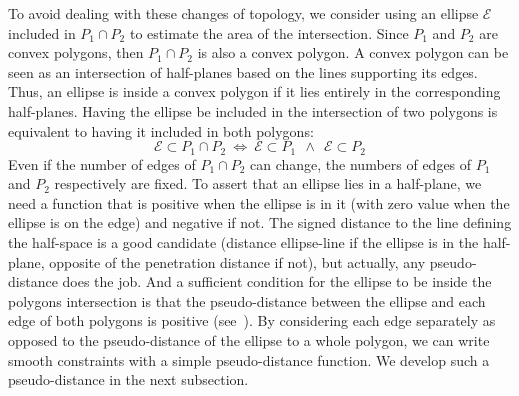 To avoid dealing with these changes of topology, we consider using an ellipse $\mathcal{E}$ included in $P_1 \cap P_2$ to estimate the area of the intersection.
Since $P_1$ and $P_2$ are convex polygons, then $P_1 \cap P_2$ is also a convex polygon.
A convex polygon can be seen as an intersection of half-planes based on the lines supporting its edges.
Thus, an ellipse is inside a convex polygon if it lies entirely in the corresponding half-planes.
Having the ellipse be included in the intersection of two polygons is equivalent to having it included in both polygons:
\begin{equation}
\mathcal{E} \subset P_1 \cap P_2 \ \Longleftrightarrow \
\mathcal{E} \subset P_1 \ \ \wedge \ \  \mathcal{E} \subset P_2
\end{equation}
Even if the number of edges of $P_1 \cap P_2$ can change, the numbers of edges of $P_1$ and $P_2$ respectively are fixed.
To assert that an ellipse lies in a half-plane, we need a function that is positive when the ellipse is in it (with zero value when the ellipse is on the edge) and negative if not.
The signed distance to the line defining the half-space is a good candidate (distance ellipse-line if the ellipse is in the half-plane, opposite of the penetration distance if not), but actually, any pseudo-distance does the job.
And a sufficient condition for the ellipse to be inside the polygons intersection is that the pseudo-distance between the ellipse and each edge of both polygons is positive (see~\Figref{fig:distance}{}).
By considering each edge separately as opposed to the pseudo-distance of the ellipse to a whole polygon, we can write smooth constraints with a simple pseudo-distance function.
We develop such a pseudo-distance in the next subsection.
